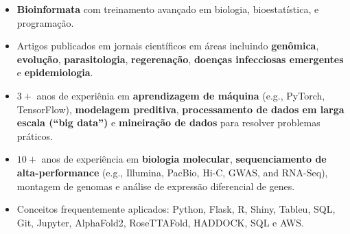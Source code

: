 \documentclass[11pt, letterpaper, sans]{moderncv}
\begin{document}
\thispagestyle{empty}\maketitle


\vspace{-3em}

\begin{itemize}

\item \textbf{Bioinformata} com treinamento avançado em biologia, bioestatística, e programação.

\item Artigos publicados em jornais científicos em áreas incluindo \textbf{genômica}, \textbf{evolução}, \textbf{parasitologia}, \textbf{regerenação}, \textbf{doenças infecciosas emergentes} e \textbf{epidemiologia}.

\item $3+$ anos de experiênia em \textbf{aprendizagem de máquina} (e.g., PyTorch, TensorFlow), \textbf{modelagem preditiva}, \textbf{processamento de dados em larga escala (``big data'')} e \textbf{mineiração de dados} para resolver problemas práticos.

\item $10+$ anos de experiência em \textbf{biologia molecular}, \textbf{sequenciamento de alta-performance} (e.g., Illumina, PacBio, Hi-C, GWAS, and RNA-Seq), montagem de genomas e análise de expressão diferencial de genes.

\item Conceitos frequentemente aplicados: Python, Flask, R, Shiny, Tableu, SQL, Git, Jupyter, AlphaFold2, RoseTTAFold, HADDOCK, SQL e AWS.

\end{itemize}


\vspace{-0.5em}
\end{document}
